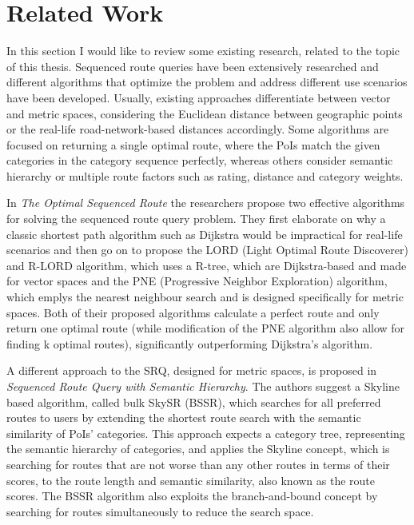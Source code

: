 \chapter{Related Work}
\label{sec:relwork}
In this section I would like to review some existing research, related to the topic of this thesis. Sequenced route queries have been extensively researched and different algorithms that optimize the problem and address different use scenarios have been developed. Usually, existing approaches differentiate between vector and metric spaces, considering the Euclidean distance between geographic points or the real-life road-network-based distances accordingly. Some algorithms are focused on returning a single optimal route, where the PoIs match the given categories in the category sequence perfectly, whereas others consider semantic hierarchy or multiple route factors such as rating, distance and category weights. \newline

In \textit{The Optimal Sequenced Route} the researchers propose two effective algorithms for solving the sequenced route query problem. They first elaborate on why a classic shortest path algorithm such as Dijkstra would be impractical for real-life scenarios and then go on to propose the LORD (Light Optimal Route Discoverer) and R-LORD algorithm, which uses a R-tree, which are Dijkstra-based and made for vector spaces and the PNE (Progressive Neighbor Exploration) algorithm, which emplys the nearest neighbour search and is designed specifically for metric spaces. Both of their proposed algorithms calculate a perfect route and only return one optimal route (while modification of the PNE algorithm also allow for finding k optimal routes), significantly outperforming Dijkstra's algorithm. \cite{OSR}
\newline

A different approach to the SRQ, designed for metric spaces, is proposed in \textit{Sequenced Route Query with Semantic Hierarchy}. The authors suggest a Skyline based algorithm, called bulk SkySR (BSSR), which searches for all preferred routes to users by extending the shortest route search with the semantic similarity of PoIs' categories. This approach expects a category tree, representing the semantic hierarchy of categories, and applies the Skyline concept, which is searching for routes that are not worse than any other routes in terms of their scores, to the route length and semantic similarity, also known as the route scores. The BSSR algorithm also exploits the branch-and-bound concept by searching for routes simultaneously to reduce the search space. \cite{semanticSRQ}
\newline

